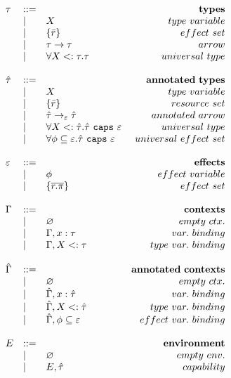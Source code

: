\documentclass{llncs}
\newcommand{\keywadj}[1]{\mathtt{#1}}
\newcommand{\keyw}[1]{\keywadj{#1}~}
\newcommand{\kw}[1]{\keyw{ #1 }}
\newcommand{\polycap}[3]{
	\forall #1. #2~ \kw{caps} #3
}
\begin{document}
\[\begin{array}{lll}
\begin{array}{lllr}
\end{array}

& ~~~~~~~~&

\begin{array}{lllr}

\tau & ::= & ~ & \bf{types} \\
	& | & X & type~variable \\
	& | & \{ \bar r \} & effect~set \\
	& | & \tau \rightarrow \tau & arrow \\
	& | & \forall X <: \tau . \tau & universal~type \\
	&&\\

\hat \tau & ::= & ~ & \bf{annotated ~types} \\
		& | & X & type~variable \\
		& | & \{ \bar r \} & resource~set \\
		& | & \hat \tau \rightarrow_{\varepsilon} \hat \tau & annotated~arrow\\
		& | & \polycap{X <: \hat \tau}{\hat \tau}{\varepsilon} & universal~type\\
		& | & \polycap{\phi \subseteq \varepsilon}{\hat \tau}{\varepsilon} & universal~effect~set \\
		&&\\

\varepsilon & ::= & ~ &\bf{effects} \\
	& | & \phi & effect~variable \\
	& | & \{ \overline{r.\pi} \} & effect~set \\
	&&\\

\Gamma & ::= & ~ & \bf{contexts} \\
				& | & \varnothing & empty~ctx. \\
				& | & \Gamma, x: \tau & var.~binding \\
				& | & \Gamma, X <: \tau & type~var.~binding \\
				&&\\
				
\hat \Gamma & ::= & ~ & \bf{annotated~contexts}\\
				& | & \varnothing & empty~ctx. \\
				& | & \hat \Gamma, x: \hat \tau & var.~binding \\
				& | & \hat \Gamma, X <: \hat \tau & type~var.~binding \\
				& | & \hat \Gamma, \phi \subseteq \varepsilon & effect~var.~binding \\
				&&\\

E & ::= & ~ & \bf{environment}\\
	& | & \varnothing & empty~env. \\
	& | & E, \hat \tau & capability \\
	&&\\

\end{array}

\end{array}
\]
\end{document}
